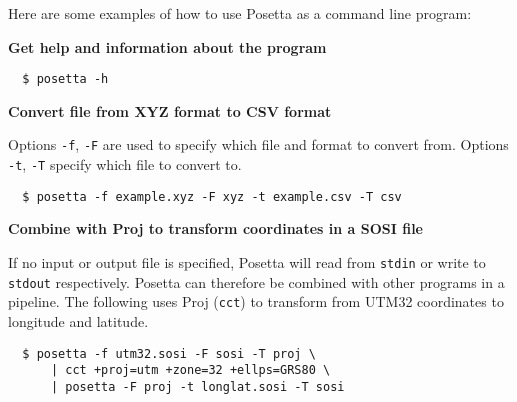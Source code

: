 Here are some examples of how to use Posetta as a command line program:

\textbf{Get help and information about the program}

\begin{verbatim}
  $ posetta -h
\end{verbatim}

\textbf{Convert file from XYZ format to CSV format}

Options \texttt{-f}, \texttt{-F} are used to specify which file and format to convert from. Options \texttt{-t}, \texttt{-T} specify which file to convert to.

\begin{verbatim}
  $ posetta -f example.xyz -F xyz -t example.csv -T csv
\end{verbatim}

\textbf{Combine with Proj to transform coordinates in a SOSI file}

If no input or output file is specified, Posetta will read from \texttt{stdin} or write to \texttt{stdout} respectively. Posetta can therefore be combined with other programs in a pipeline. The following uses Proj (\texttt{cct}) to transform from UTM32 coordinates to longitude and latitude.

\begin{verbatim}
  $ posetta -f utm32.sosi -F sosi -T proj \
      | cct +proj=utm +zone=32 +ellps=GRS80 \
      | posetta -F proj -t longlat.sosi -T sosi
\end{verbatim}

\endinput
